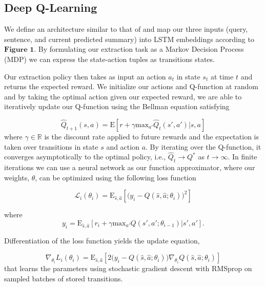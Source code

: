 \documentclass[12pt]{article}
\begin{document}
\subsection{Deep Q-Learning}

We define an architecture similar to that of \cite{narasimhan2015language} and map our three inputs (query, sentence, and current predicted summary) into LSTM embeddings according to $\textbf{Figure 1}$. By formulating our extraction task as a Markov Decision Process (MDP) we can express the state-action tuples as transitions states. 

Our extraction policy then takes as input an action $a_t$ in state $s_t$ at time $t$ and returns the expected reward. We initialize our actions and Q-function at random and by taking the optimal action given our expected reward, we are able to iteratively update our Q-function using the Bellman equation \cite{sutton1998reinforcement} satisfying

\begin{equation}
	\hat{Q}_{t+1}(s,a) = \textrm{E}[ r + \gamma \textrm{max}_{a'} \hat{Q}_t(s', a') | s, a]
\end{equation}
where $\gamma \in \mathbb{R}$ is the discount rate applied to future rewards and the expectation is taken over transitions in state $s$ and action $a$. By iterating over the Q-function, it converges asymptotically to the optimal policy, i.e.,  $\hat{Q}_t \rightarrow Q^{*}$ as $t \rightarrow \infty$. In finite iterations we can use a neural network as our function approximator, where our weights, $\theta$, can be optimized using the following loss function

\begin{equation}
	\mathcal{L}_i(\theta_i) =  \textrm{E}_{\hat{s}, \hat{a}}[ \big (y_i - Q(\hat{s}, \hat{a}; \theta_i) \big )^2]
\end{equation}

where 
\begin{equation}
	y_i = \textrm{E}_{\hat{s}, \hat{a}}[ r_i + \gamma \textrm{max}_{a'} Q(s', a' ; \theta_{i-1}) | s', a' ].
\end{equation}

Differentiation of the loss function yields the update equation,

\begin{equation}
	\nabla_{\theta_i} L_i(\theta_i) = \textrm{E}_{\hat{s}, \hat{a}}[ 2  \big (y_i - Q(\hat{s}, \hat{a}; \theta_i) \big ) \nabla_{\theta_{i}}  Q(\hat{s}, \hat{a}; \theta_i)]
\end{equation}
that learns the parameters using stochastic gradient descent with RMSprop \cite{hinton2012lecture} on sampled batches of stored transitions.
\end{document}
